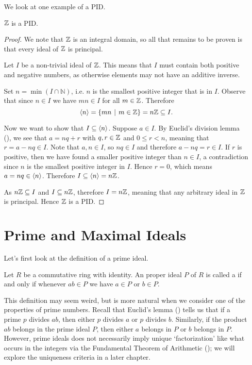 We look at one example of a PID.
\begin{proposition}\label{prop-Z-is-PID}
    $\mathbb{Z}$ is a PID.
\end{proposition}
\begin{proof}
    We note that $\mathbb{Z}$ is an integral domain, so all that remains to be proven is that every ideal of $\mathbb{Z}$ is principal.

    Let $I$ be a non-trivial ideal of $\mathbb{Z}$. This means that $I$ must contain both positive and negative numbers, as otherwise elements may not have an additive inverse.

    Set $n = \min(I \cap \mathbb{N})$, i.e. $n$ is the smallest positive integer that is in $I$. Observe that since $n \in I$ we have $mn \in I$ for all $m \in \mathbb{Z}$. Therefore
    \[
        \princ{n} = \{mn \vert m \in \Z\} = n\Z \subseteq I.
    \]

    Now we want to show that $I \subseteq \left\langle n\right\rangle$. Suppose $a \in I$. By Euclid's division lemma (), we see that $a = nq + r$ with $q, r \in \mathbb{Z}$ and $0 \leq r < n$, meaning that $r = a - nq \in I$. Note that $a, n \in I$, so $nq \in I$ and therefore $a - nq = r \in I$. If $r$ is positive, then we have found a smaller positive integer than $n \in I$, a contradiction since $n$ is the smallest positive integer in $I$. Hence $r = 0$, which means $a = nq \in \left\langle n\right\rangle$. Therefore $I \subseteq \left\langle n\right\rangle = n\mathbb{Z}$.

    As $n\mathbb{Z} \subseteq I$ and $I \subseteq n\mathbb{Z}$, therefore $I = n\mathbb{Z}$, meaning that any arbitrary ideal in $\mathbb{Z}$ is principal. Hence $\mathbb{Z}$ is a PID.
\end{proof}

\section{Prime and Maximal Ideals}\label{section-prime-and-maximal-ideals}
Let's first look at the definition of a prime ideal.

\begin{definition}
    Let $R$ be a commutative ring with identity. An proper ideal $P$ of $R$ is called a  if and only if whenever $ab \in P$ we have $a \in P$ or $b \in P$.
\end{definition}

This definition may seem weird, but is more natural when we consider one of the properties of prime numbers. Recall that Euclid's lemma () tells us that if a prime $p$ divides $ab$, then either $p$ divides $a$ or $p$ divides $b$. Similarly, if the product $ab$ belongs in the prime ideal $P$, then either $a$ belongs in $P$ or $b$ belongs in $P$. However, prime ideals does not necessarily imply unique `factorization' like what occurs in the integers via the Fundamental Theorem of Arithmetic (); we will explore the uniqueness criteria in a later chapter.


